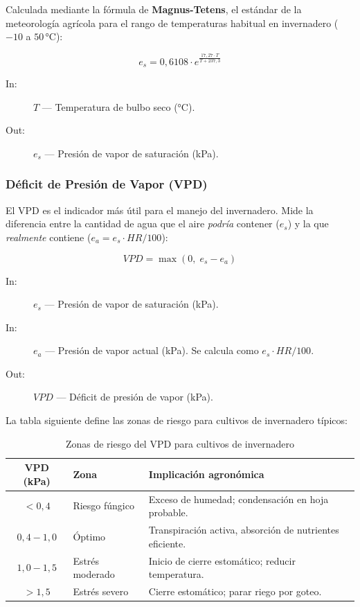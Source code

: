 Calculada mediante la fórmula de \textbf{Magnus-Tetens}, el estándar de la meteorología
agrícola para el rango de temperaturas habitual en invernadero ($-10$ a $50$\,°C):

\[
e_s = 0{,}6108 \cdot e^{\displaystyle\frac{17{,}27 \cdot T}{T + 237{,}3}}
\]

\begin{description}
        \item [In:] $T$ — Temperatura de bulbo seco (°C).
    \item [Out:] $e_s$ — Presión de vapor de saturación (kPa).
\end{description}

\subsubsection{Déficit de Presión de Vapor (VPD)}

El VPD es el indicador más útil para el manejo del invernadero. Mide la diferencia entre
la cantidad de agua que el aire \textit{podría} contener ($e_s$) y la que \textit{realmente}
contiene ($e_a = e_s \cdot HR/100$):

\[
VPD = \max\left(0,\; e_s - e_a\right)
\]

\begin{description}
        \item [In:] $e_s$ — Presión de vapor de saturación (kPa).
    \item [In:] $e_a$ — Presión de vapor actual (kPa). Se calcula como $e_s \cdot HR / 100$.
    \item [Out:] $VPD$ — Déficit de presión de vapor (kPa).
\end{description}

La tabla siguiente define las zonas de riesgo para cultivos de invernadero típicos:

\begin{table}[H]
    \centering
    \caption{Zonas de riesgo del VPD para cultivos de invernadero}
    \begin{tabular}{clp{6cm}}
        \toprule
        \textbf{VPD (kPa)} & \textbf{Zona}          & \textbf{Implicación agronómica} \\
        \midrule
        $< 0{,}4$           & Riesgo fúngico         & Exceso de humedad; condensación en hoja probable. \\
        $0{,}4 - 1{,}0$     & Óptimo                 & Transpiración activa, absorción de nutrientes eficiente. \\
        $1{,}0 - 1{,}5$     & Estrés moderado        & Inicio de cierre estomático; reducir temperatura. \\
        $> 1{,}5$           & Estrés severo          & Cierre estomático; parar riego por goteo. \\
        \bottomrule
    \end{tabular}
    \label{tab:vpd_zones}
\end{table}

